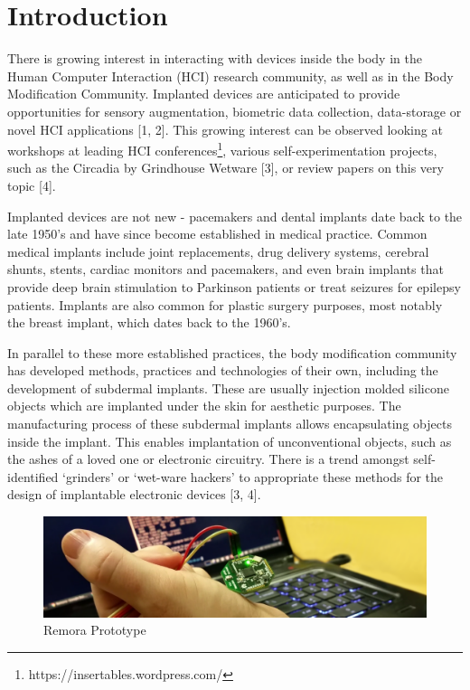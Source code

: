 \documentclass[runningheads,a4paper]{llncs}
\begin{document}
\section{Introduction}
There is growing interest in interacting with devices inside the body in the Human Computer Interaction (HCI) research community, as well as in the Body Modification Community. Implanted devices are anticipated to provide opportunities for sensory augmentation, biometric data collection, data-storage or novel HCI applications [1, 2]. This growing interest can be observed looking at workshops at leading HCI conferences\footnote{https://insertables.wordpress.com/},  various self-experimentation projects, such as the Circadia by Grindhouse Wetware [3], or review papers on this very topic [4].

Implanted devices are not new - pacemakers and dental implants date back to the late 1950’s and have since become established in medical practice. Common medical implants include joint replacements, drug delivery systems, cerebral shunts, stents, cardiac monitors and pacemakers, and even brain implants that provide deep brain stimulation to Parkinson patients or treat seizures for epilepsy patients. Implants are also common for plastic surgery purposes, most notably the breast implant, which dates back to the 1960’s.

In parallel to these more established practices, the body modification community has developed methods, practices and technologies of their own, including the development of subdermal implants. These are usually injection molded silicone objects which are implanted under the skin for aesthetic purposes. The manufacturing process of these subdermal implants allows encapsulating objects inside the implant. This enables implantation of unconventional objects, such as the ashes of a loved one or electronic circuitry. There is a trend amongst self-identified ‘grinders’ or ‘wet-ware hackers’ to appropriate these methods for the design of implantable electronic devices [3, 4]. 


\begin{figure}
 \includegraphics[scale=1]{device}
 

\caption{Remora Prototype}
\end{figure}
\end{document}
